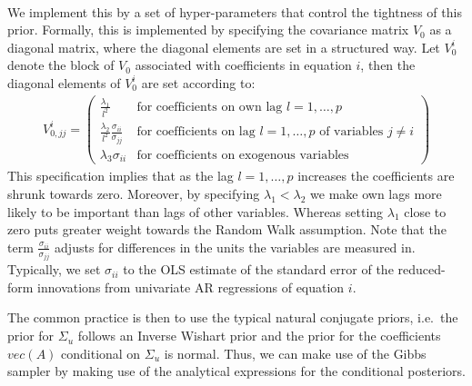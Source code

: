 \begin{enumerate}
\begin{enumerate}
    \\
    We implement this by a set of hyper-parameters that control the tightness of this prior.
    Formally, this is implemented by specifying the covariance matrix \(V_0\) as a diagonal matrix,
    where the diagonal elements are set in a structured way.
    Let \(V^i_{0}\) denote the block of \(V_0\) associated with coefficients in equation \(i\),
      then the diagonal elements of \(V^i_{0}\) are set according to:
    \begin{align*}
        V^i_{0,jj} = \begin{pmatrix}
                        \frac{\lambda_{1}}{l^2} & \text{for coefficients on own lag \(l=1,\ldots,p\)}
                        \\
                        \frac{\lambda_{2}}{l^2} \frac{\sigma_{ii}}{\sigma_{jj}} & \text{for coefficients on lag \(l=1,\ldots,p\) of variables \(j\neq i\)}
                        \\
                        \lambda_3 \sigma_{ii} & \text{for coefficients on exogenous variables}
                    \end{pmatrix}
    \end{align*}
    This specification implies that as the lag \(l=1,\ldots,p\) increases the coefficients are shrunk towards zero.
    Moreover, by specifying \(\lambda_1<\lambda_2\) we make own lags more likely to be important than lags of other variables.
    Whereas setting \(\lambda_1\) close to zero puts greater weight towards the Random Walk assumption.
    Note that the term \(\frac{\sigma_{ii}}{\sigma_{jj}}\) adjusts for differences in the units the variables are measured in. 
    Typically, we set \(\sigma_{ii}\) to the OLS estimate of the standard error of the reduced-form innovations from univariate AR regressions of equation \(i\).
    
    The common practice is then to use the typical natural conjugate priors,
      i.e.\ the prior for \(\Sigma_u\) follows an Inverse Wishart prior and the prior for the coefficients \(vec(A)\) conditional on \(\Sigma_u\) is normal.
    Thus, we can make use of the Gibbs sampler by making use of the analytical expressions for the conditional posteriors.
  \end{enumerate}

\end{enumerate}